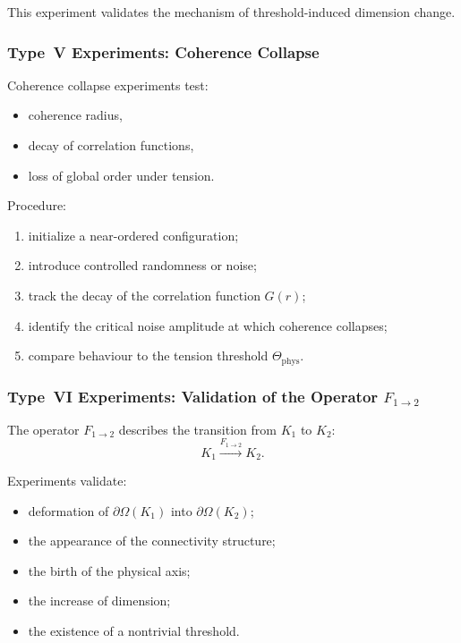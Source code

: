 This experiment validates the mechanism of threshold-induced dimension change.



\subsubsection{Type~V Experiments: Coherence Collapse}

Coherence collapse experiments test:

\begin{itemize}
    \item coherence radius,
    \item decay of correlation functions,
    \item loss of global order under tension.
\end{itemize}

Procedure:

\begin{enumerate}
    \item initialize a near-ordered configuration;
    \item introduce controlled randomness or noise;
    \item track the decay of the correlation function $G(r)$;
    \item identify the critical noise amplitude at which coherence 
          collapses;
    \item compare behaviour to the tension threshold $\Theta_{\mathrm{phys}}$.
\end{enumerate}



\subsubsection{Type~VI Experiments: Validation of the Operator $F_{1\rightarrow 2}$}

The operator $F_{1\rightarrow 2}$ describes the transition from $K_1$ to $K_2$:
\[
   K_1 \xrightarrow{F_{1\rightarrow 2}} K_2.
\]

Experiments validate:

\begin{itemize}
    \item deformation of $\partial\Omega(K_1)$ into 
          $\partial\Omega(K_2)$;
    \item the appearance of the connectivity structure;
    \item the birth of the physical axis;
    \item the increase of dimension;
    \item the existence of a nontrivial threshold.
\end{itemize}

